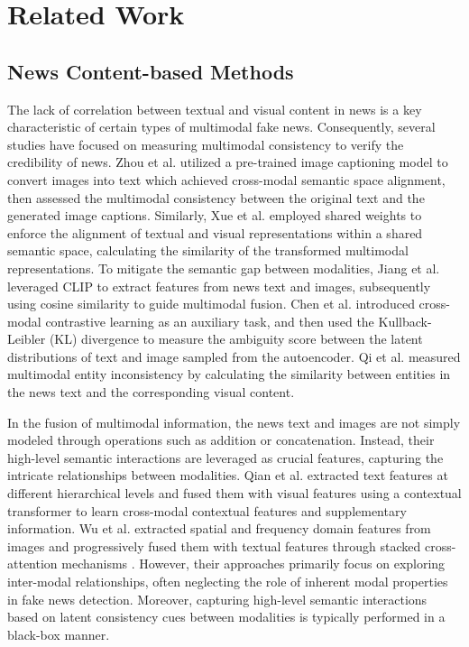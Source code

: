 \section{Related Work}

\subsection{News Content-based Methods}
The lack of correlation between textual and visual content in news is a key characteristic of certain types of multimodal fake news. Consequently, several studies have focused on measuring multimodal consistency to verify the credibility of news. Zhou et al. \cite{zhou2020similarity} utilized a pre-trained image captioning model to convert images into text which achieved cross-modal semantic space alignment, then assessed the multimodal consistency between the original text and the generated image captions. Similarly, Xue et al. \cite{xue2021detecting} employed shared weights to enforce the alignment of textual and visual representations within a shared semantic space, calculating the similarity of the transformed multimodal representations. To mitigate the semantic gap between modalities, Jiang et al. \cite{jiang2023similarity} leveraged CLIP \cite{radford2021learning} to extract features from news text and images, subsequently using cosine similarity to guide multimodal fusion. Chen et al. \cite{chen2022cross} introduced cross-modal contrastive learning as an auxiliary task, and then used the Kullback-Leibler (KL) divergence to measure the ambiguity score between the latent distributions of text and image sampled from the autoencoder. Qi et al. \cite{qi2021improving} measured multimodal entity inconsistency by calculating the similarity between entities in the news text and the corresponding visual content. 

In the fusion of multimodal information, the news text and images are not simply modeled through operations such as addition or concatenation. Instead, their high-level semantic interactions are leveraged as crucial features, capturing the intricate relationships between modalities. Qian et al. \cite{qian2021hierarchical} extracted text features at different hierarchical levels and fused them with visual features using a contextual transformer to learn cross-modal contextual features and supplementary information. Wu et al. \cite{wei2022cross} extracted spatial and frequency domain features from images and progressively fused them with textual features through stacked cross-attention mechanisms \cite{lu2019vilbert}.
However, their approaches primarily focus on exploring inter-modal relationships, often neglecting the role of inherent modal properties in fake news detection. Moreover, capturing high-level semantic interactions based on latent consistency cues between modalities is typically performed in a black-box manner.

